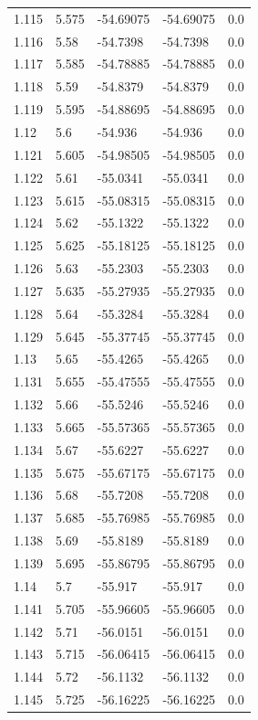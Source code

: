 \begin{tabular}{lllll}
1.115 & 5.575 & -54.69075 & -54.69075 & 0.0 \\
1.116 & 5.58 & -54.7398 & -54.7398 & 0.0 \\
1.117 & 5.585 & -54.78885 & -54.78885 & 0.0 \\
1.118 & 5.59 & -54.8379 & -54.8379 & 0.0 \\
1.119 & 5.595 & -54.88695 & -54.88695 & 0.0 \\
1.12 & 5.6 & -54.936 & -54.936 & 0.0 \\
1.121 & 5.605 & -54.98505 & -54.98505 & 0.0 \\
1.122 & 5.61 & -55.0341 & -55.0341 & 0.0 \\
1.123 & 5.615 & -55.08315 & -55.08315 & 0.0 \\
1.124 & 5.62 & -55.1322 & -55.1322 & 0.0 \\
1.125 & 5.625 & -55.18125 & -55.18125 & 0.0 \\
1.126 & 5.63 & -55.2303 & -55.2303 & 0.0 \\
1.127 & 5.635 & -55.27935 & -55.27935 & 0.0 \\
1.128 & 5.64 & -55.3284 & -55.3284 & 0.0 \\
1.129 & 5.645 & -55.37745 & -55.37745 & 0.0 \\
1.13 & 5.65 & -55.4265 & -55.4265 & 0.0 \\
1.131 & 5.655 & -55.47555 & -55.47555 & 0.0 \\
1.132 & 5.66 & -55.5246 & -55.5246 & 0.0 \\
1.133 & 5.665 & -55.57365 & -55.57365 & 0.0 \\
1.134 & 5.67 & -55.6227 & -55.6227 & 0.0 \\
1.135 & 5.675 & -55.67175 & -55.67175 & 0.0 \\
1.136 & 5.68 & -55.7208 & -55.7208 & 0.0 \\
1.137 & 5.685 & -55.76985 & -55.76985 & 0.0 \\
1.138 & 5.69 & -55.8189 & -55.8189 & 0.0 \\
1.139 & 5.695 & -55.86795 & -55.86795 & 0.0 \\
1.14 & 5.7 & -55.917 & -55.917 & 0.0 \\
1.141 & 5.705 & -55.96605 & -55.96605 & 0.0 \\
1.142 & 5.71 & -56.0151 & -56.0151 & 0.0 \\
1.143 & 5.715 & -56.06415 & -56.06415 & 0.0 \\
1.144 & 5.72 & -56.1132 & -56.1132 & 0.0 \\
1.145 & 5.725 & -56.16225 & -56.16225 & 0.0 \\

\end{tabular}
